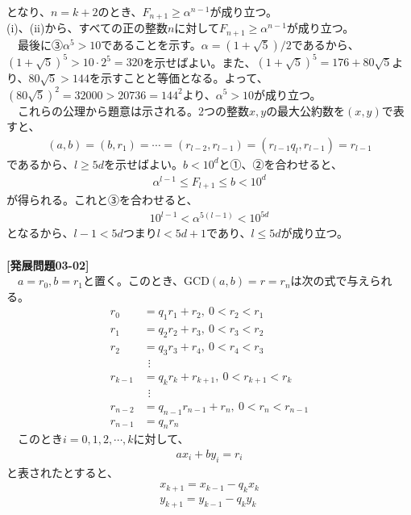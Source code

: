 \documentclass[a4paper,10.5pt]{ltjsarticle}
\begin{document}
となり、$n=k+2$のとき、$F_{n+1}\geq{\alpha}^{n-1}$が成り立つ。\\
(i)、(ii)から、すべての正の整数$n$に対して$F_{n+1}\geq{\alpha}^{n-1}$が成り立つ。\\
　最後に③${\alpha}^5>10$であることを示す。$\alpha=(1+\sqrt{5})/2$であるから、$(1+\sqrt{5})^5>10\cdot 2^5=320$を示せばよい。また、$(1+\sqrt{5})^5=176+80\sqrt{5}$より、$80\sqrt{5}>144$を示すことと等価となる。よって、$\left(80\sqrt{5}\right)^2=32000>20736=144^2$より、${\alpha}^5>10$が成り立つ。\\
　これらの公理から題意は示される。2つの整数$x,y$の最大公約数を$(x,y)$で表すと、
\begin{align*}
  (a,b)=(b,r_1)=\cdots=(r_{l-2},r_{l-1})=(r_{l-1}q_l,r_{l-1})=r_{l-1}
\end{align*}
であるから、$l\geq5d$を示せばよい。$b<10^d$と①、②を合わせると、
\begin{align*}
  {\alpha}^{l-1}\leq F_{l+1}\leq b<10^d
\end{align*}
が得られる。これと③を合わせると、
\begin{align*}
  10^{l-1}<{\alpha}^{5(l-1)}<10^{5d}
\end{align*}
となるから、$l-1<5d$つまり$l<5d+1$であり、$l\leq5d$が成り立つ。\\
\\
{\large\bfseries [発展問題03-02]}\\
　$a=r_0,b=r_1$と置く。このとき、$\mathrm{GCD}(a,b)=r=r_n$は次の式で与えられる。
\begin{align}
  r_0&=q_1r_1+r_2,\ 0<r_2<r_1\\
  r_1&=q_2r_2+r_3,\ 0<r_3<r_2\\
  r_2&=q_3r_3+r_4,\ 0<r_4<r_3\\
  &\hspace{5pt}\vdots\nonumber\\
  r_{k-1}&=q_kr_k+r_{k+1},\ 0<r_{k+1}<r_k\\
  &\hspace{5pt}\vdots\nonumber\\
  r_{n-2}&=q_{n-1}r_{n-1}+r_n,\ 0<r_n<r_{n-1}\\
  r_{n-1}&=q_nr_n
\end{align}
　このとき$i=0,1,2,\cdots,k$に対して、
\begin{align}
  ax_i+by_i=r_i
\end{align}
と表されたとすると、
\begin{align}
  x_{k+1}=x_{k-1}-q_kx_k\\
  y_{k+1}=y_{k-1}-q_ky_k
\end{align}
\end{document}
